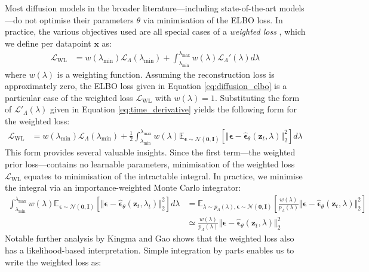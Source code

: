 \documentclass[ oneside,%
                    author={George Herbert},
                    degree={MSci},
                     title={Diffusion Models for Time-Evolving Precipitation Fields},
                  subtitle={}]{dissertation}
\begin{document}
Most diffusion models in the broader literature---including state-of-the-art models---do not optimise their parameters $\theta$ via minimisation of the ELBO loss. In practice, the various objectives used are all special cases of a \textit{weighted loss} \cite{Understanding_Diffusion_Objective_Kingma}, which we define per datapoint $\mathbf{x}$ as:
\begin{align}
      \mathcal{L}_{\mathrm{WL}}&=w(\lambda_{\min})\mathcal{L}_\Lambda(\lambda_{\min})+\int_{\lambda_{\min}}^{\lambda_{\max}}w(\lambda)\mathcal{L}_\Lambda'(\lambda)d\lambda\label{eq:weighted_loss}
\end{align}
where $w(\lambda)$ is a weighting function. Assuming the reconstruction loss is approximately zero, the ELBO loss given in Equation \ref{eq:diffusion_elbo} is a particular case of the weighted loss $\mathcal{L}_{\mathrm{WL}}$ with $w(\lambda) = 1$. Substituting the form of $\mathcal{L}'_\Lambda(\lambda)$ given in Equation \ref{eq:time_derivative} yields the following form for the weighted loss:
\begin{align}
      \mathcal{L}_{\mathrm{WL}}&=w(\lambda_{\min})\mathcal{L}_\Lambda(\lambda_{\min})+\frac{1}{2}\int_{\lambda_{\min}}^{\lambda_{\max}}w(\lambda)\mathbb{E}_{\boldsymbol\epsilon\sim\mathcal{N}(\mathbf{0},\mathbf{I})}\left[\Vert\boldsymbol\epsilon-\hat{\boldsymbol\epsilon}_\theta(\mathbf{z}_t,\lambda)\Vert_2^2\right]d\lambda
\end{align}
This form provides several valuable insights. Since the first term---the weighted prior loss---contains no learnable parameters, minimisation of the weighted loss $\mathcal{L}_{\mathrm{WL}}$ equates to minimisation of the intractable integral. In practice, we minimise the integral via an importance-weighted Monte Carlo integrator:
\begin{align}
      \int_{\lambda_{\min}}^{\lambda_{\max}}w(\lambda)\mathbb{E}_{\boldsymbol\epsilon\sim\mathcal{N}(\mathbf{0},\mathbf{I})}\left[\Vert\boldsymbol\epsilon-\hat{\boldsymbol\epsilon}_\theta(\mathbf{z}_t,\lambda_t)\Vert_2^2\right]d\lambda
      &=\mathbb{E}_{\lambda\sim p_\Lambda(\lambda),\boldsymbol\epsilon\sim\mathcal{N}(\mathbf{0}, \mathbf{I})}\left[\frac{w(\lambda)}{p_\Lambda(\lambda)}\Vert \boldsymbol\epsilon-\hat{\boldsymbol\epsilon}_\theta(\mathbf{z}_t,\lambda)\Vert_2^2\right]\\
      &\simeq \frac{w(\lambda)}{p_\Lambda(\lambda)}\Vert \boldsymbol\epsilon-\hat{\boldsymbol\epsilon}_\theta(\mathbf{z}_t,\lambda)\Vert_2^2
\end{align}
Notable further analysis by Kingma and Gao \cite{Understanding_Diffusion_Objective_Kingma} shows that the weighted loss also has a likelihood-based interpretation. Simple integration by parts enables us to write the weighted loss as:
\end{document}

